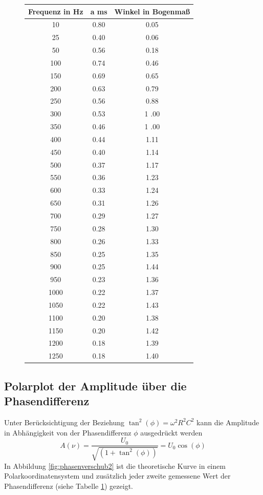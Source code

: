 \begin{figure}[h!]
	\centering
	\begin{tabular}{c|c|c}
	Frequenz in \si{\hertz}& a \si{\milli\second} & Winkel in Bogenmaß\\
		\hline
		10 & 0.80  & 0.05 \\
		25 & 0.40  & 0.06 \\
		50 & 0.56 & 0.18 \\
		100 & 0.74 & 0.46 \\
		150 & 0.69 & 0.65 \\
		200 & 0.63 & 0.79 \\
		250 & 0.56 & 0.88 \\
		300 & 0.53 & 1 .00   \\
		350 & 0.46 & 1 .00   \\
		400 & 0.44 & 1.11 \\
		450 & 0.40  & 1.14 \\
		500 & 0.37 & 1.17 \\
		550 & 0.36 & 1.23 \\
		600 & 0.33 & 1.24 \\
		650 & 0.31 & 1.26 \\
		700 & 0.29 & 1.27 \\
		750 & 0.28 & 1.30  \\
		800 & 0.26 & 1.33 \\
		850 & 0.25 & 1.35 \\
		900 & 0.25 & 1.44 \\
		950 & 0.23 & 1.36 \\
		1000 & 0.22 & 1.37 \\
		1050 & 0.22 & 1.43 \\
		1100 & 0.20  & 1.38 \\
		1150 & 0.20 & 1.42 \\
		1200 & 0.18 & 1.39 \\
		1250 & 0.18 & 1.40 
	\end{tabular}
	\label{tab:phasenverschub}
\end{figure}

\clearpage
\subsection{Polarplot der Amplitude über die Phasendifferenz}
Unter Berücksichtigung der Beziehung $\tan^2(\phi) = \omega ^2 R^2 C^2$ kann die Amplitude in Abhängigkeit von der Phasendifferenz $\phi$ ausgedrückt werden
\begin{equation}
A(\nu) = \frac{U_0}{\sqrt{(1+\tan^2(\phi))}} = U_0 \cos(\phi)
\end{equation}
In Abbildung \ref{fig:phasenverschub2} ist die theoretische Kurve in einem Polarkoordinatensystem und zusätzlich jeder zweite gemessene Wert der Phasendifferenz (siehe Tabelle \ref{tab:phasenverschub}) gezeigt.

